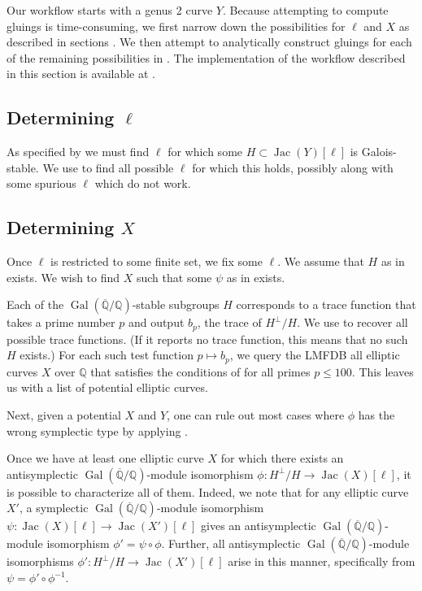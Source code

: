 \documentclass{amsproc}
\numberwithin{equation}{section}
\theoremstyle{definition}
\theoremstyle{remark}
\DeclareMathOperator{\Jac}{Jac}
\DeclareMathOperator{\Gal}{Gal}
\newcommand{\QQ}{\mathbb Q}
\newcommand{\Qbar}{\overline{\QQ}}
\newcommand{\GalQ}{\Gal(\Qbar/\QQ)}
\begin{document}
Our workflow starts with a genus 2 curve $Y$. Because attempting to compute gluings is time-consuming, we first narrow down the possibilities for $\ell$ and $X$ as described in sections . We then attempt to analytically construct gluings for each of the remaining possibilities in . The implementation of the workflow described in this section is available at \cite{our_code}.

\subsection{Determining \texorpdfstring{$\ell$}{ℓ}}
\label{subsec:determine_ell}
As specified by  we must find $\ell$ for which some $H \subset \Jac(Y)[\ell]$ is Galois-stable. We use  to find all possible $\ell$ for which this holds, possibly along with some spurious $\ell$ which do not work.

\subsection{Determining \texorpdfstring{$X$}{X}}
\label{subsec:determine_X}
Once $\ell$ is restricted to some finite set, we fix some $\ell$. We assume that $H$ as in  exists. We wish to find $X$ such that some $\psi$ as in  exists. 

Each of the $\GalQ$-stable subgroups $H$ corresponds to a trace function that takes a prime number $p$ and output $b_p$, the trace of $H^\perp/H$. We use  to recover all possible trace functions. (If it reports no trace function, this means that no such $H$ exists.) For each such test function $p\mapsto b_p$, we query the LMFDB all elliptic curves $X$ over $\QQ$ that satisfies the conditions of  for all primes $p\leq 100$. This leaves us with a list of potential elliptic curves. 

Next, given a potential $X$ and $Y$, one can rule out most cases where $\phi$ has the wrong symplectic type by applying .

Once we have at least one elliptic curve $X$ for which there exists an antisymplectic $\GalQ$-module isomorphism $\phi: H^\perp/H \to \Jac(X)[\ell]$, it is possible to characterize all of them. Indeed, we note that for any elliptic curve $X'$, a symplectic $\GalQ$-module isomorphism $\psi: \Jac(X)[\ell] \to \Jac(X')[\ell]$ gives an antisymplectic $\GalQ$-module isomorphism $\phi' = \psi \circ \phi$. Further, all antisymplectic $\GalQ$-module isomorphisms $\phi': H^\perp/H \to \Jac(X')[\ell]$ arise in this manner, specifically from $\psi = \phi' \circ \phi^{-1}$.
\end{document}
